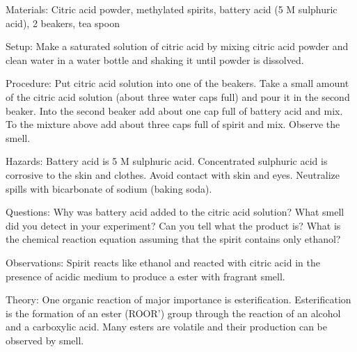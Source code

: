 \begin{multicols}{2}
\begin{description*}
\item[Materials:]{Citric acid powder, methylated spirits, battery acid (5 M sulphuric acid), 2 beakers, tea spoon}
\item[Setup:]{Make a saturated solution of citric acid by mixing citric acid powder and clean water in a water bottle and shaking it until powder is dissolved.}
\item[Procedure:]{Put citric acid solution into one of the beakers. Take a small amount of the citric acid solution (about three water caps full) and pour it in the second beaker. Into the second beaker add about one cap full of battery acid and mix. To the mixture above add about three caps full of spirit and mix. Observe the smell.}
\item[Hazards:]{Battery acid is 5 M sulphuric acid. Concentrated sulphuric acid is corrosive to the skin and clothes. Avoid contact with skin and eyes. Neutralize spills with bicarbonate of sodium (baking soda).}
\item[Questions:]{Why was battery acid added to the citric acid solution? What smell did you detect in your experiment? Can you tell what the product is? What is the chemical reaction equation assuming that the spirit contains only ethanol?}
\item[Observations:]{Spirit reacts like ethanol and reacted with citric acid in the presence of acidic medium to produce a ester with fragrant smell.}
\item[Theory:]{One organic reaction of major importance is esterification. Esterification is the formation of an ester (ROOR') group through the reaction of an alcohol and a carboxylic acid. Many esters are volatile and their production can be observed by smell.}
\end{description*}


\end{multicols}

\pagebreak